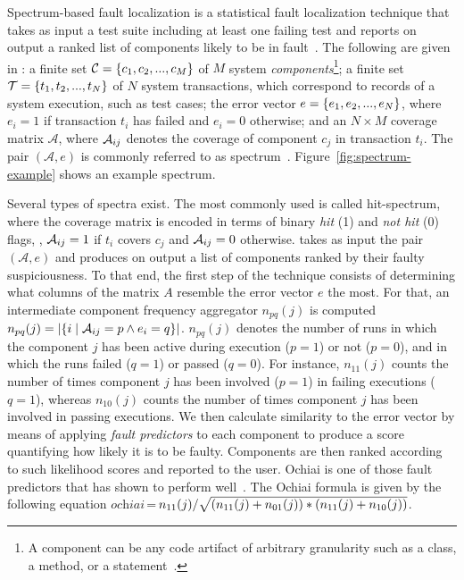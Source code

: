 \documentclass{article}
\begin{document}
Spectrum-based fault localization is a statistical fault
localization technique that takes as input a test suite including at
least one failing test and reports on output a ranked list of
components likely to be in
fault~\cite{FLSurvey2016,DBLP:conf/kbse/JonesH05,DBLP:journals/smr/LuciaLJTB14,DBLP:journals/jss/AbreuZGG09}. The
following are given in \sfl{}: a finite set $\mathcal{C}=\{{}c_1,c_2,...,c_M\}$
of $M$ system \emph{components}\footnote{A
component can be any code artifact of arbitrary granularity
such as a class, a method, or a statement~\cite{DBLP:journals/stvr/HarroldRSWY00}.};
a finite set $\mathcal{T} = \{{}t_1,t_2,...,t_N\}$ of $N$ system transactions,
which correspond to records of a system execution, such as test cases;
the error vector $e = \{{}e_1,e_2,...,e_N\}$, where $e_i = 1$ if
transaction $t_i$ has failed and $e_i = 0$ otherwise; and an
$N\times{}M$ coverage matrix $\mathcal{A}$, where $\mathcal{A}_{ij}$ denotes the
coverage of component $c_j$ in transaction $t_i$.  The pair
$(\mathcal{A},e)$ is commonly referred to as
spectrum~\cite{DBLP:journals/stvr/HarroldRSWY00}. Figure~\ref{fig:spectrum-example}
shows an example spectrum.

Several types of spectra exist.  The most commonly used is called
hit-spectrum, where the coverage matrix is encoded in terms of binary
\emph{hit} (1) and \emph{not hit} (0) flags, \ie{}, $\mathcal{A}_{ij} = 1$ if
$t_i$ covers $c_j$ and $\mathcal{A}_{ij} = 0$ otherwise.  \sfl{} takes as input
the pair $(\mathcal{A},e)$ and produces on output a list of components
ranked by their faulty suspiciousness. To that end, the first step of
the technique consists of determining what columns of the matrix $A$
resemble the error vector $e$ the most.  For that, an intermediate
component frequency aggregator $n_{pq}(j)$ is computed $n_{pq}(j) =
|\{i\mid \mathcal{A}_{ij}=p \wedge e_i=q\}|$. $n_{pq}(j)$ denotes the number of
runs in which the component $j$ has been active during execution ($p =
1$) or not ($p=0$), and in which the runs failed ($q = 1$) or passed
($q = 0$).  For instance, $n_{11}(j)$ counts the number of times
component $j$ has been involved ($p = 1$) in failing executions ($q =
1$), whereas $n_{10}(j)$ counts the number of times component $j$ has
been involved in passing executions. We then calculate similarity to
the error vector by means of applying \emph{fault predictors} to each
component to produce a score quantifying how likely it is to be
faulty.  Components are then ranked according to such likelihood
scores and reported to the user. Ochiai is one of those fault
predictors that has shown to perform
well~\cite{7390282,Pearson:2017:EIF:3097368.3097441}. The Ochiai
formula is given by the following equation
$\textit{ochiai}\,$=$\,n_{11}(j)/\sqrt{(n_{11}(j)+n_{01}(j)) * (n_{11}(j)+n_{10}(j))}$.
\end{document}
